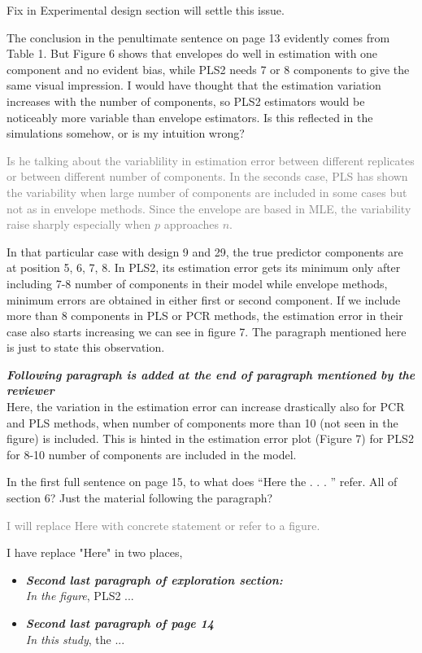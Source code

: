 \documentclass[12pt, a4paper]{scrartcl}
\begin{document}
\textcolor{answers}{Fix in Experimental design section will settle this issue.}

The conclusion in the penultimate sentence on page 13 evidently comes from Table 1. But Figure 6 shows that envelopes do well in estimation with one component and no evident bias, while PLS2 needs 7 or 8 components to give the same visual impression. I would have thought that the estimation variation increases with the number of components, so PLS2 estimators would be noticeably more variable than envelope estimators. Is this reflected in the simulations somehow, or is my intuition wrong?

\textcolor{gray}{Is he talking about the variablility in estimation error between different replicates or between different number of components. In the seconds case, PLS has shown the variability when large number of components are included in some cases but not as in envelope methods. Since the envelope are based in MLE, the variability raise sharply especially when $p$ approaches $n$.}

\textcolor{answers}{In that particular case with design 9 and 29, the true predictor components are at position 5, 6, 7, 8. In PLS2, its estimation error gets its minimum only after including 7-8 number of components in their model while envelope methods, minimum errors are obtained in either first or second component. If we include more than 8 components in PLS or PCR methods, the estimation error in their case also starts increasing we can see in figure 7. The paragraph mentioned here is just to state this observation.}

\textcolor{answers}{
\textcolor{mycolor1}{\textbf{\textit{Following paragraph is added at the end of paragraph mentioned by the reviewer}}} \hfill \\
Here, the variation in the estimation error can increase drastically also for PCR and PLS methods, when number of components more than 10 (not seen in the figure) is included. This is hinted in the estimation error plot (Figure 7) for PLS2 for 8-10 number of components are included in the model.}

In the first full sentence on page 15, to what does “Here the . . . ” refer. All of section 6? Just the material following the paragraph?

\textcolor{gray}{I will replace Here with concrete statement or refer to a figure.}

\textcolor{answers}{I have replace "Here" in two places,
\begin{itemize}
    \item \textcolor{mycolor1}{\textbf{\textit{Second last paragraph of exploration section:}}}\\ \textit{In the figure}, PLS2 ...
    \item \textcolor{mycolor1}{\textbf{\textit{Second last paragraph of page 14}}}\\ \textit{In this study}, the ...
\end{itemize}}
\end{document}
